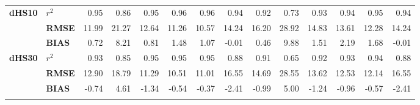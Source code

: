 \begin{table}[t]
\begin{tabular}{llrrrrrrrrrrrr}
\cline{1-14}
\multirow{3}{*}{\textbf{dHS10}} & \textbf{$r^{2}$} &                  0.95 &  0.86 &  0.95 &  0.96 &  0.96 &  0.94 &                     0.92 &  0.73 &  0.93 &  0.94 &  0.95 &  0.94 \\
      & \textbf{RMSE} &                 11.99 & 21.27 & 12.64 & 11.26 & 10.57 & 14.24 &                    16.20 & 28.92 & 14.83 & 13.61 & 12.28 & 14.24 \\
      & \textbf{BIAS} &                  0.72 &  8.21 &  0.81 &  1.48 &  1.07 & -0.01 &                     0.46 &  9.88 &  1.51 &  2.19 &  1.68 & -0.01 \\
\cline{1-14}
\multirow{3}{*}{\textbf{dHS30}} & \textbf{$r^{2}$} &                  0.93 &  0.85 &  0.95 &  0.95 &  0.95 &  0.88 &                     0.91 &  0.65 &  0.92 &  0.93 &  0.94 &  0.88 \\
      & \textbf{RMSE} &                 12.90 & 18.79 & 11.29 & 10.51 & 11.01 & 16.55 &                    14.69 & 28.55 & 13.62 & 12.53 & 12.14 & 16.55 \\
      & \textbf{BIAS} &                 -0.74 &  4.61 & -1.34 & -0.54 & -0.37 & -2.41 &                    -0.99 &  5.00 & -1.24 & -0.96 & -0.57 & -2.41 \\
\bottomhline
\end{tabular}
\end{table}
